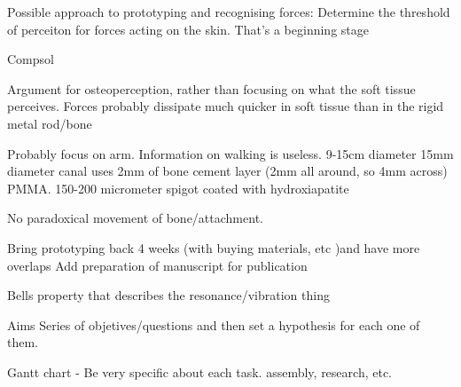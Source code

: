 Possible approach to prototyping and recognising forces: 
Determine the threshold of perceiton for forces acting on the skin.
That's a beginning stage 

Compsol

Argument for osteoperception, rather than focusing on what the soft tissue perceives. 
Forces probably dissipate much quicker in soft tissue than in the rigid metal rod/bone

Probably focus on arm. Information on walking is useless.
9-15cm diameter
15mm diameter canal uses 2mm of bone cement layer (2mm all around, so 4mm across) PMMA. 
150-200 micrometer spigot coated with hydroxiapatite 

No paradoxical movement of bone/attachment.


Bring prototyping back 4 weeks (with buying materials, etc )and have more overlaps
Add preparation of manuscript for publication


Bells property that describes the resonance/vibration thing


Aims
Series of objetives/questions and then set a hypothesis for each one of them.

Gantt chart - Be very specific about each task. assembly, research, etc.
